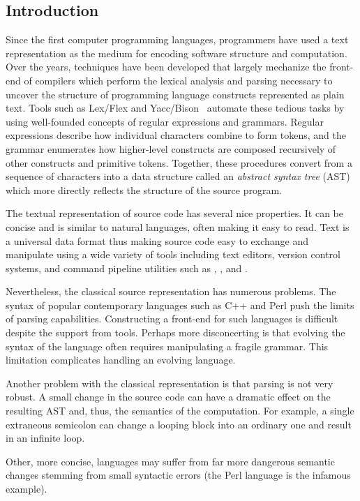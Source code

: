 \documentclass{article}
\begin{document}
\begin{multicols}{2}

\section{Introduction}
\label{sec-intro}

Since the first computer programming languages, programmers have used a
text representation as the medium for encoding software structure and
computation.  Over the years, techniques have been developed that
largely mechanize the front-end of compilers which perform the lexical
analysis and parsing necessary to uncover the structure of programming
language constructs represented as plain text.  Tools such as Lex/Flex
and Yacc/Bison~\cite{Levine92} automate these tedious tasks by using
well-founded concepts of regular expressions and grammars. Regular
expressions describe how individual characters combine to form tokens,
and the grammar enumerates how higher-level constructs are composed
recursively of other constructs and primitive tokens.  Together, these
procedures convert from a sequence of characters into a data structure
called an \emph{abstract syntax tree} (AST) which more directly reflects
the structure of the source program.

The textual representation of source code has several nice properties.
It can be concise and is similar to natural languages, often making it
easy to read.  Text is a universal data format thus making source code
easy to exchange and manipulate using a wide variety of tools including
text editors, version control systems, and command pipeline utilities
such as , , and .

Nevertheless, the classical source representation has numerous problems.
The syntax of popular contemporary languages such as C++ and Perl push
the limits of parsing capabilities.  Constructing a front-end for such
languages is difficult despite the support from tools.  Perhaps more
disconcerting is that evolving the syntax of the language often requires
manipulating a fragile grammar.  This limitation complicates handling an
evolving language.

Another problem with the classical representation is that parsing is not
very robust.  A small change in the source code can have a dramatic
effect on the resulting AST and, thus, the semantics of the computation.
For example, a single extraneous semicolon can change a looping block
into an ordinary one and result in an infinite loop.
Other, more concise, languages may suffer from far more dangerous
semantic changes stemming from small syntactic errors (the Perl language
is the infamous example).


\end{multicols}
\end{document}
